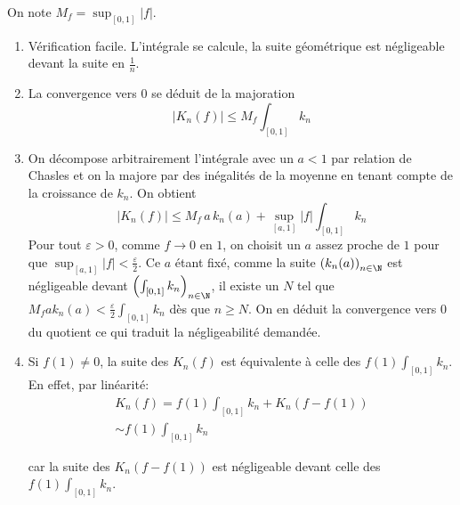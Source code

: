 On note $M_f= \sup_{[0,1]}|f|$.
\begin{enumerate}
 \item Vérification facile. L'intégrale se calcule, la suite géométrique est négligeable devant la suite en $\frac{1}{n}$.
 \item La convergence vers $0$ se déduit de la majoration 
\begin{displaymath}
 |K_n(f)|\leq M_f \int_{[0,1]}k_n
\end{displaymath}
 \item On décompose arbitrairement l'intégrale avec un $a<1$ par relation de Chasles et on la majore par des inégalités de la moyenne en tenant compte de la croissance de $k_n$. On obtient
\begin{displaymath}
 |K_n(f)|\leq M_f\, a\, k_n(a) + \sup_{[a,1]}|f|\int_{[0,1]}k_n
\end{displaymath}
Pour tout $\varepsilon >0$, comme $f\rightarrow 0$ en $1$, on choisit un $a$ assez proche de $1$  pour que $\sup_{[a,1]}|f|<\frac{\varepsilon}{2}$. Ce $a$ étant fixé, comme la suite $\left( k_n(a)\right) _{n\in \N}$ est négligeable devant $\left( \int_{[0,1]}k_n\right)_{n\in \N}$, il existe un $N$ tel que $M_fak_n(a)<\frac{\varepsilon}{2}\int_{[0,1]}k_n$ dès que $n\geq N$.\newline
On en déduit la convergence vers $0$ du quotient ce qui traduit la négligeabilité demandée.
 \item Si $f(1)\neq 0$, la suite des $K_n(f)$ est équivalente à celle des $f(1)\int_{[0,1]}k_n$.\newline
En effet, par linéarité:
\begin{multline*}
  K_n(f) = f(1)\int_{[0,1]}k_n + K_n(f-f(1))\\ \sim f(1)\int_{[0,1]}k_n
\end{multline*}

 car la suite des $K_n(f-f(1))$ est négligeable devant celle des $f(1)\int_{[0,1]}k_n$.
\end{enumerate}
